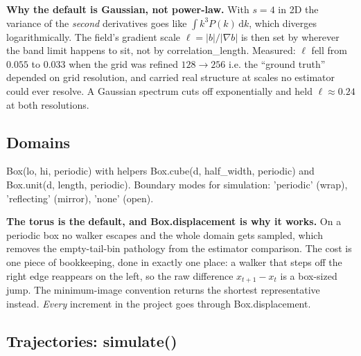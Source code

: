 \documentclass[11pt,a4paper]{article}
\newcommand{\code}[1]{{\ttfamily\small #1}}
\begin{document}
\begin{warnbox}
\textbf{Why the default is Gaussian, not power-law.} With $s=4$ in 2D the variance of
the \emph{second} derivatives goes like $\int k^3 P(k)\,\mathrm{d}k$, which diverges
logarithmically. The field's gradient scale $\ell = |b|/|\nabla b|$ is then set by
wherever the band limit happens to sit, not by \code{correlation\_length}. Measured:
$\ell$ fell from $0.055$ to $0.033$ when the grid was refined $128\to256$ \textemdash{}
i.e. the ``ground truth'' depended on grid resolution, and carried real structure at
scales no estimator could ever resolve. A Gaussian spectrum cuts off exponentially and
held $\ell \approx 0.24$ at both resolutions.
\end{warnbox}

\subsection{Domains}

\code{Box(lo, hi, periodic)} with helpers \code{Box.cube(d, half\_width, periodic)} and
\code{Box.unit(d, length, periodic)}. Boundary modes for simulation: \code{'periodic'}
(wrap), \code{'reflecting'} (mirror), \code{'none'} (open).

\begin{keybox}
\textbf{The torus is the default, and \code{Box.displacement} is why it works.}
On a periodic box no walker escapes and the whole domain gets sampled, which removes
the empty-tail-bin pathology from the estimator comparison. The cost is one piece of
bookkeeping, done in exactly one place: a walker that steps off the right edge
reappears on the left, so the raw difference $x_{t+1}-x_t$ is a box-sized jump. The
minimum-image convention returns the shortest representative instead. \emph{Every}
increment in the project goes through \code{Box.displacement}.
\end{keybox}

\subsection{Trajectories: \code{simulate()}}
\end{document}
